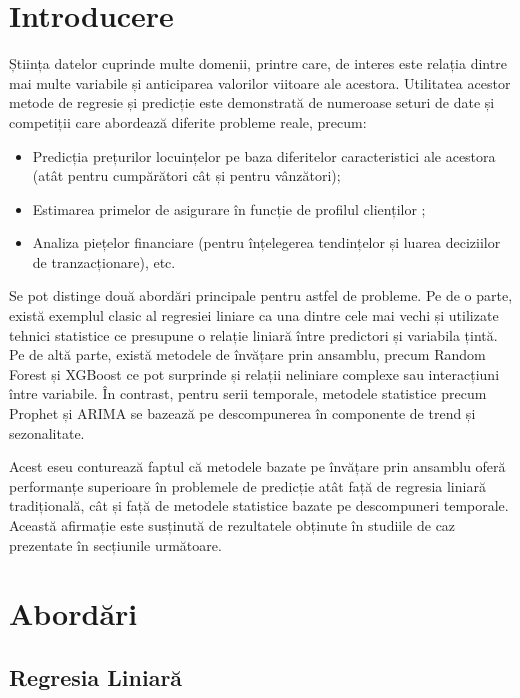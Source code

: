 \documentclass[a4paper,12pt]{article}
\begin{document}
\section{Introducere}
Știința datelor cuprinde multe domenii, printre care, de interes este relația dintre mai multe variabile și anticiparea valorilor viitoare ale acestora. Utilitatea acestor metode de regresie și predicție este demonstrată de numeroase seturi de date și competiții care abordează diferite probleme reale, precum:
\begin{itemize}
    \item Predicția prețurilor locuințelor pe baza diferitelor caracteristici ale acestora \cite{house_prices_kaggle} (atât pentru cumpărători cât și pentru vânzători);
    \item Estimarea primelor de asigurare în funcție de profilul clienților \cite{insurance_dataset};
    \item Analiza piețelor financiare \cite{stock_dataset} (pentru înțelegerea tendințelor și luarea deciziilor de tranzacționare), etc.
\end{itemize}

Se pot distinge două abordări principale pentru astfel de probleme. Pe de o parte, există exemplul clasic al regresiei liniare ca una dintre cele mai vechi și utilizate tehnici statistice ce presupune o relație liniară între predictori și variabila țintă. Pe de altă parte, există metodele de învățare prin ansamblu, precum Random Forest \cite{breiman2001random} și XGBoost \cite{chen2016xgboost} ce pot surprinde și relații neliniare complexe sau interacțiuni între variabile. În contrast, pentru serii temporale, metodele statistice precum Prophet \cite{taylor2018prophet} și ARIMA se bazează pe descompunerea în componente de trend și sezonalitate.

Acest eseu conturează faptul că metodele bazate pe învățare prin ansamblu oferă performanțe superioare în problemele de predicție atât față de regresia liniară tradițională, cât și față de metodele statistice bazate pe descompuneri temporale. Această afirmație este susținută de rezultatele obținute în studiile de caz prezentate în secțiunile următoare.
\section{Abordări}

\subsection{Regresia Liniară}
\end{document}
